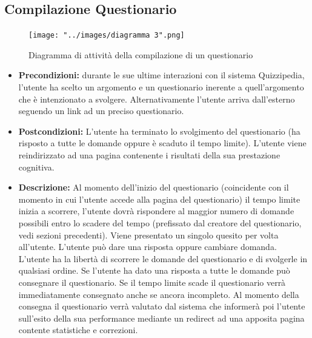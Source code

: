 \documentclass[a4paper,11pt]{article}
\begin{document}
\subsection{Compilazione Questionario}
\begin{figure}[h!]
\begin{center}
	\texttt{[image: "../images/diagramma 3".png]}
	\caption{Diagramma di attività della compilazione di un questionario}
\end{center}
\end{figure}
\begin{itemize}
\item\textbf{Precondizioni:} durante le sue ultime interazioni con il sistema Quizzipedia, l'utente ha scelto un argomento e un questionario inerente a quell'argomento che è intenzionato a svolgere. Alternativamente l'utente arriva dall'esterno seguendo un link ad un preciso questionario.
\item\textbf{Postcondizioni:} L'utente ha terminato lo svolgimento del questionario (ha risposto a tutte le domande oppure è scaduto il tempo limite). L'utente viene reindirizzato ad una pagina contenente i risultati della sua prestazione cognitiva.
\item\textbf{Descrizione:} Al momento dell'inizio del questionario (coincidente con il momento in cui l'utente accede alla pagina del questionario) il tempo limite inizia a scorrere, l'utente dovrà rispondere al maggior numero di domande possibili entro lo scadere del tempo (prefissato dal creatore del questionario, vedi sezioni precedenti). Viene presentato un singolo quesito per volta all'utente. L'utente può dare una risposta oppure cambiare domanda. L'utente ha la libertà di scorrere le domande del questionario e di svolgerle in qualsiasi ordine. Se l'utente ha dato una risposta a tutte le domande può consegnare il questionario. Se il tempo limite scade il questionario verrà immediatamente consegnato anche se ancora incompleto. Al momento della consegna il questionario verrà valutato dal sistema che informerà poi l'utente sull'esito della sua performance mediante un redirect ad una apposita pagina contente statistiche e correzioni.
\end{itemize}

\newpage
\end{document}
